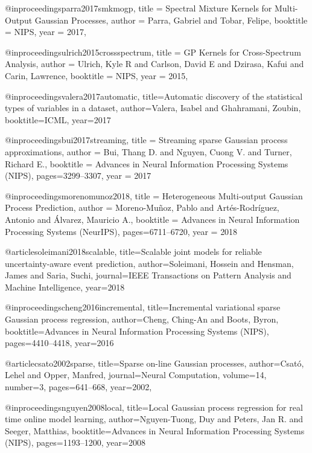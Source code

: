 \documentclass[]{article}
\begin{document}
@inproceedings{parra2017smkmogp,
title = {Spectral Mixture Kernels for Multi-Output {G}aussian Processes},
author = {Parra, Gabriel and Tobar, Felipe},
booktitle = {NIPS},
year = {2017},
}

@inproceedings{ulrich2015crossspectrum,
title = {{GP} Kernels for Cross-Spectrum Analysis},
author = {Ulrich, Kyle R and Carlson, David E and Dzirasa, Kafui and Carin, Lawrence},
booktitle = {NIPS},
year = {2015},
}

@inproceedings{valera2017automatic,
	title={Automatic discovery of the statistical types of variables in a dataset},
	author={Valera, Isabel and Ghahramani, Zoubin},
	booktitle={ICML},
	year={2017}
}

@inproceedings{bui2017streaming,
	title =  {Streaming sparse {G}aussian process approximations},
	author =   {Bui, Thang D. and Nguyen, Cuong V. and Turner, Richard E.},
	booktitle = {Advances in Neural Information Processing Systems (NIPS)},
	pages={3299--3307},
	year =   {2017}
}

@inproceedings{morenomunoz2018,
	title =  {Heterogeneous Multi-output {G}aussian Process Prediction},
	author =   {Moreno-Mu\~noz, Pablo and Art\'es-Rodr\'iguez, Antonio and \'Alvarez, Mauricio A.},
	booktitle = {Advances in Neural Information Processing Systems (NeurIPS)},
	pages={6711--6720},
	year =   {2018}
}

@article{soleimani2018scalable,
	title={Scalable joint models for reliable uncertainty-aware event prediction},
	author={Soleimani, Hossein and Hensman, James and Saria, Suchi},
	journal={IEEE Transactions on Pattern Analysis and Machine Intelligence},
	year={2018}
}

@inproceedings{cheng2016incremental,
	title={Incremental variational sparse {G}aussian process regression},
	author={Cheng, Ching-An and Boots, Byron},
	booktitle={Advances in Neural Information Processing Systems (NIPS)},
	pages={4410--4418},
	year={2016}
}

@article{csato2002sparse,
	title={Sparse on-line {G}aussian processes},
	author={Csat{\'o}, Lehel and Opper, Manfred},
	journal={Neural Computation},
	volume={14},
	number={3},
	pages={641--668},
	year={2002},
}

@inproceedings{nguyen2008local,
	title={Local {G}aussian process regression for real time online model learning},
	author={Nguyen-Tuong, Duy and Peters, Jan R. and Seeger, Matthias},
	booktitle={Advances in Neural Information Processing Systems (NIPS)},
	pages={1193--1200},
	year={2008}
}
\end{document}
